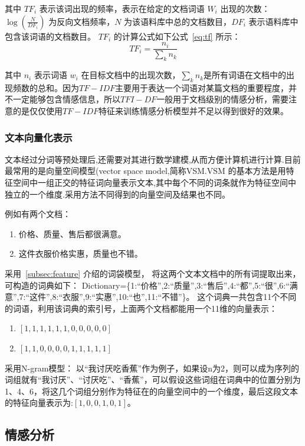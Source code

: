 \documentclass[cs4size,a4paper]{ctexart}
\numberwithin{equation}{section}
\numberwithin{table}{section}
\numberwithin{figure}{section}
\begin{document}
其中 ${TF}_i$ 表示该词出现的频率，表示在给定的文档词语 $W_i$ 出现的次数：$\log(\frac{N}{DF_i})$ 为反向文档频率，$N$ 为该语料库中总的文档数目，$DF_i$ 表示语料库中包含该词语的文档数目。 $TF_i$ 的计算公式如下公式~\ref{eq:tf} 所示：
\begin{equation}\label{eq:tf}
TF_i = \frac{n_i}{\sum_{k}n_k}
\end{equation}

其中 $n_i$ 表示词语 $w_i$ 在目标文档中的出现次数，$\sum_{k}n_k$是所有词语在文档中的出现频数的总和。因为$TF-IDF$主要用于表达一个词语对某篇文档的重要程度，并不一定能够包含情感信息，所以$TFI-DF$一般用于文档级别的情感分析，需要注意的是仅仅使用$TF-IDF$特征来训练情感分析模型并不足以得到很好的效果。

\subsubsection{文本向量化表示}

文本经过分词等预处理后,还需要对其进行数学建模,从而方便计算机进行计算.目前最常用的是向量空间模型(vector space model,简称VSM.VSM 的基本方法是用特征空间中一组正交的特征词向量表示文本,其中每个不同的词条就作为特征空间中独立的一个维度.采用方法不同得到的向量空间及结果也不同。

例如有两个文档：
\begin{enumerate}
  \item 价格、质量、售后都很满意。
  \item 这件衣服价格实惠，质量也不错。
\end{enumerate}
采用~\ref{subsec:feature} 介绍的词袋模型，
将这两个文本文档中的所有词提取出来，可构造的词典如下：
Dictionary=\{1:“价格”,2:“质量”,3:“售后”,4:“都”,5:“很”,6:“满意”,7:“这件”,8:“衣服”,9:“实惠”,10:“也”,11:“不错”\}。
这个词典一共包含11个不同的词语，利用该词典的索引号，上面两个文档都能用一个11维的向量表示：

\begin{enumerate}
  \item $\left[1, 1, 1, 1, 1, 1, 0, 0, 0, 0, 0 \right]$
  \item $\left[1, 1, 0, 0, 0, 0, 1, 1, 1, 1, 1 \right]$
\end{enumerate}

 采用N-gram模型：
 以“我讨厌吃香蕉”作为例子，如果设n为2，则可以成为序列的词组就有“我讨厌”、“讨厌吃”、“香蕉”，可以假设这些词组在词典中的位置分别为1、4、6，将这几个词组分别作为特征在的向量空间中的一个维度，最后这段文本的特征向量表示为:$\left[1, 0, 0, 1, 0, 1\right]$。

\subsection{情感分析}
\end{document}
